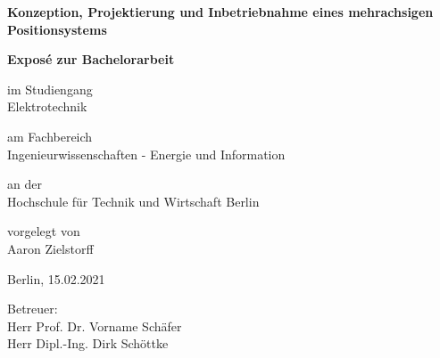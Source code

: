 \documentclass[12pt, a4paper, twoside]{article} %
\begin{document}
\begin{titlepage}
	\begin{center}
	\vspace*{0.2cm}
	
	\huge
	\textbf{Konzeption, Projektierung und Inbetriebnahme eines mehrachsigen Positionsystems}
	
	\vspace*{2.0cm}
	\Large
	\textbf{Exposé zur Bachelorarbeit}
	
	\vspace*{1.2cm}
	\normalsize
	im Studiengang\\
	\Large
	Elektrotechnik
	
	\vspace*{0.9cm}
	\normalsize
	am Fachbereich\\
	\Large
	Ingenieurwissenschaften - Energie und Information
	
	\vspace*{0.9cm}
	\normalsize
	an der\\
	\Large
	Hochschule für Technik und Wirtschaft Berlin
	
	\vspace*{1.6cm}
	\normalsize
	vorgelegt von\\
	\Large
	Aaron Zielstorff
	
	\vspace*{0.7cm}
	\normalsize
	Berlin, 15.02.2021
	
	\vspace*{1.6cm}
	\normalsize
	Betreuer:\\
	Herr Prof. Dr. Vorname Schäfer\\
	Herr Dipl.-Ing. Dirk Schöttke
	
	\end{center}
\end{titlepage}


\setcounter{tocdepth}{2} %
\tableofcontents
\thispagestyle{empty}
\clearpage



\end{document}
